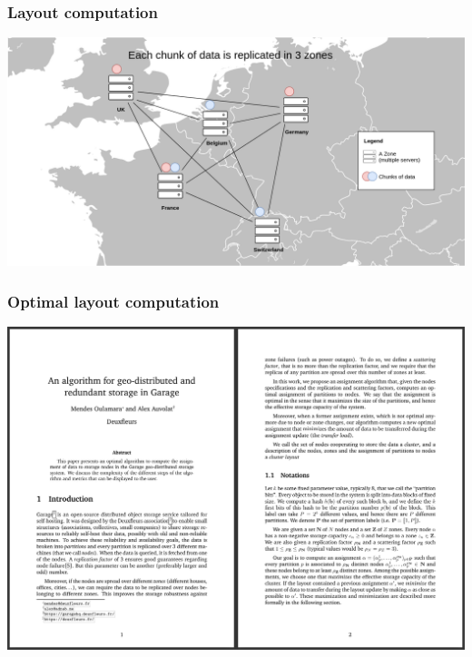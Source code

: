 \documentclass[aspectratio=169]{beamer}
\begin{document}
\begin{frame}
	\frametitle{Layout computation}
		\begin{center}
			\includegraphics[width=.8\linewidth]{../assets/map.png}
		\end{center}
\end{frame}

\begin{frame}
	\frametitle{Optimal layout computation}
		\begin{center}
			\includegraphics[width=.6\linewidth]{../assets/geodistrib_paper.png}
		\end{center}
\end{frame}
\end{document}
